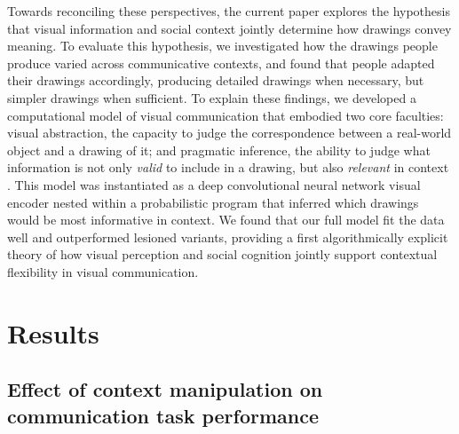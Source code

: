 \documentclass{svjour3}
\begin{document}
Towards reconciling these perspectives, the current paper explores the hypothesis that visual information and social context jointly determine how drawings convey meaning.
To evaluate this hypothesis, we investigated how the drawings people produce varied across communicative contexts, and found that people adapted their drawings accordingly, producing detailed drawings when necessary, but simpler drawings when sufficient.
To explain these findings, we developed a computational model of visual communication that embodied two core faculties: visual abstraction, the capacity to judge the correspondence between a real-world object and a drawing of it; and pragmatic inference, the ability to judge what information is not only \textit{valid} to include in a drawing, but also \textit{relevant} in context  \citep*{goodman2016pragmatic,grice1975syntax,abell2009canny}.
This model was instantiated as a deep convolutional neural network visual encoder nested within a probabilistic program that inferred which drawings would be most informative in context.
We found that our full model fit the data well and outperformed lesioned variants, providing a first algorithmically explicit theory of how visual perception and social cognition jointly support contextual flexibility in visual communication.

\section*{Results}

\subsection*{Effect of context manipulation on communication task performance}


\end{document}
